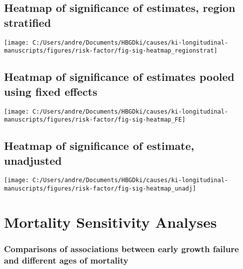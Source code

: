 \documentclass[
  9pt,
]{book}
\begin{document}
\hypertarget{heatmap-of-significance-of-estimates-region-stratified}{%
\section{Heatmap of significance of estimates, region stratified}\label{heatmap-of-significance-of-estimates-region-stratified}}

\texttt{[image: C:/Users/andre/Documents/HBGDki/causes/ki-longitudinal-manuscripts/figures/risk-factor/fig-sig-heatmap\_regionstrat]}

\hypertarget{heatmap-of-significance-of-estimates-pooled-using-fixed-effects}{%
\section{Heatmap of significance of estimates pooled using fixed effects}\label{heatmap-of-significance-of-estimates-pooled-using-fixed-effects}}

\texttt{[image: C:/Users/andre/Documents/HBGDki/causes/ki-longitudinal-manuscripts/figures/risk-factor/fig-sig-heatmap\_FE]}

\hypertarget{heatmap-of-significance-of-estimate-unadjusted}{%
\section{Heatmap of significance of estimate, unadjusted}\label{heatmap-of-significance-of-estimate-unadjusted}}

\texttt{[image: C:/Users/andre/Documents/HBGDki/causes/ki-longitudinal-manuscripts/figures/risk-factor/fig-sig-heatmap\_unadj]}

\hypertarget{mortality}{%
\chapter{Mortality Sensitivity Analyses}\label{mortality}}

\raggedright

\hypertarget{comparisons-of-associations-between-early-growth-failure-and-different-ages-of-mortality}{%
\subsection{Comparisons of associations between early growth failure and different ages of mortality}\label{comparisons-of-associations-between-early-growth-failure-and-different-ages-of-mortality}}
\end{document}
